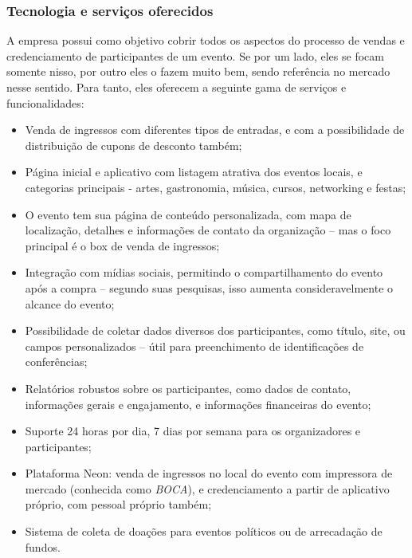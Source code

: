 \documentclass[12pt,a4paper,twoside,hyphens,english,brazil]{abntex2}
\begin{document}
\subsubsection*{Tecnologia e serviços oferecidos}
A empresa possui como objetivo cobrir todos os aspectos do processo de vendas e credenciamento de participantes de um evento. Se por um lado, eles se focam somente nisso, por outro eles o fazem muito bem, sendo referência no mercado nesse sentido. Para tanto, eles oferecem a seguinte gama de serviços e funcionalidades:
\begin{itemize}[itemsep=-1ex]
	\item Venda de ingressos com diferentes tipos de entradas, e com a possibilidade de distribuição de cupons de desconto também;
	\item Página inicial e aplicativo com listagem atrativa dos eventos locais, e categorias principais - artes, gastronomia, música, cursos, networking e festas;
	\item O evento tem sua página de conteúdo personalizada, com mapa de localização, detalhes e informações de contato da organização -- mas o foco principal é o box de venda de ingressos;
	\item Integração com mídias sociais, permitindo o compartilhamento do evento após a compra -- segundo suas pesquisas, isso aumenta consideravelmente o alcance do evento;
	\item Possibilidade de coletar dados diversos dos participantes, como título, site, ou campos personalizados -- útil para preenchimento de identificações de conferências;
	\item Relatórios robustos sobre os participantes, como dados de contato, informações gerais e engajamento, e informações financeiras do evento;
	\item Suporte 24 horas por dia, 7 dias por semana para os organizadores e participantes;
	\item Plataforma Neon: venda de ingressos no local do evento com impressora de mercado (conhecida como \emph{BOCA}), e credenciamento a partir de aplicativo próprio, com pessoal próprio também;
	\item Sistema de coleta de doações para eventos políticos ou de arrecadação de fundos.
\end{itemize}

\end{document}
